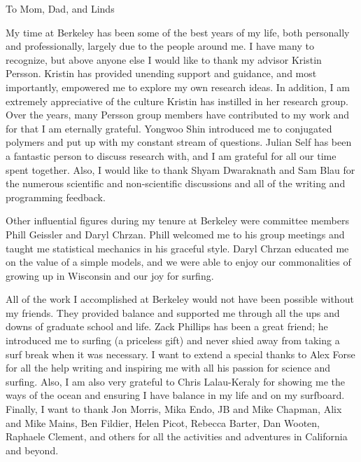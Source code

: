\documentclass{ucbthesis}
\begin{document}
\begin{frontmatter}

\begin{dedication}
\null\vfil
\begin{center}
To Mom, Dad, and Linds\\\vspace{12pt}
\end{center}
\vfil\null
\end{dedication}


\tableofcontents
\clearpage
\listoffigures
\clearpage
\listoftables

\begin{acknowledgements}
  My time at Berkeley has been some of the best years of my life, both personally and professionally, largely due to the people around me. I have many to recognize, but above anyone else I would like to thank my advisor Kristin Persson. Kristin has provided unending support and guidance, and most importantly, empowered me to explore my own research ideas. In addition, I am extremely appreciative of the culture Kristin has instilled in her research group. Over the years, many Persson group members have contributed to my work and for that I am eternally grateful. Yongwoo Shin introduced me to conjugated polymers and put up with my constant stream of questions. Julian Self has been a fantastic person to discuss research with, and I am grateful for all our time spent together. Also, I would like to thank Shyam Dwaraknath and Sam Blau for the numerous scientific and non-scientific discussions and all of the writing and programming feedback.

  Other influential figures during my tenure at Berkeley were committee members Phill Geissler and Daryl Chrzan. Phill welcomed me to his group meetings and taught me statistical mechanics in his graceful style. Daryl Chrzan educated me on the value of a simple models, and we were able to enjoy our commonalities of growing up in Wisconsin and our joy for surfing.

  All of the work I accomplished at Berkeley would not have been possible without my friends. They provided balance and supported me through all the ups and downs of graduate school and life. Zack Phillips has been a great friend; he introduced me to surfing (a priceless gift) and never shied away from taking a surf break when it was necessary. I want to extend a special thanks to Alex Forse for all the help writing and inspiring me with all his passion for science and surfing. Also, I am also very grateful to Chris Lalau-Keraly for showing me the ways of the ocean and ensuring I have balance in my life and on my surfboard. Finally, I want to thank Jon Morris, Mika Endo, JB and Mike Chapman, Alix and Mike Mains, Ben Fildier, Helen Picot, Rebecca Barter, Dan Wooten, Raphaele Clement, and others for all the activities and adventures in California and beyond.


\end{acknowledgements}
\end{frontmatter}
\end{document}
